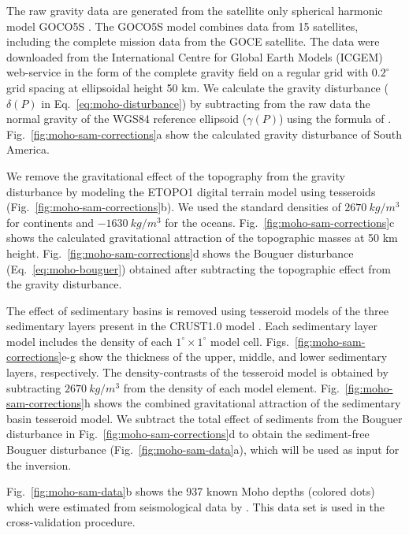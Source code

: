 The raw gravity data are generated from the satellite only
spherical harmonic model GOCO5S \citet{mayer-guerr2015}.
The GOCO5S model combines data from 15 satellites, including the complete
mission data from the GOCE satellite.
The data were downloaded from the
International Centre for Global Earth Models (ICGEM) web-service
\citep[][ \url{http://icgem.gfz-potsdam.de/ICGEM/})]{barthelmes2012}
in the form of the complete gravity field
on a regular grid with $0.2^\circ$ grid spacing at ellipsoidal height 50 km.
We calculate the gravity disturbance
($\delta(P)$ in Eq.~\ref{eq:moho-disturbance})
by subtracting from the raw data
the normal gravity of the WGS84 reference ellipsoid ($\gamma(P)$)
using the formula of \citet{li2001a}.
Fig.~\ref{fig:moho-sam-corrections}a show the calculated gravity disturbance of
South America.

We remove the gravitational effect of the topography
from the gravity disturbance
by modeling the ETOPO1 digital terrain model
\citep[][ \url{http://dx.doi.org/10.7289/V5C8276M}]{amante2009}
using tesseroids (Fig.~\ref{fig:moho-sam-corrections}b).
We used the standard densities of $2670\ kg/m^3$ for continents and
$-1630\ kg/m^3$ for the oceans.
Fig.~\ref{fig:moho-sam-corrections}c shows the calculated gravitational attraction
of the topographic masses at 50 km height.
Fig.~\ref{fig:moho-sam-corrections}d shows the Bouguer disturbance
(Eq.~\ref{eq:moho-bouguer}) obtained after subtracting the topographic effect from
the gravity disturbance.

The effect of sedimentary basins is removed using
tesseroid models of the three sedimentary layers present in the CRUST1.0 model
\citep[][ \url{http://igppweb.ucsd.edu/~gabi/rem.html}]{laske2013}.
Each sedimentary layer model includes the density
of each $1^\circ \times 1^\circ$ model cell.
Figs.~\ref{fig:moho-sam-corrections}e-g show the thickness of the upper, middle, and
lower sedimentary layers, respectively.
The density-contrasts of the tesseroid model is obtained by subtracting
$2670\ kg/m^3$ from the density of each model element.
Fig.~\ref{fig:moho-sam-corrections}h shows the combined gravitational attraction of
the sedimentary basin tesseroid model.
We subtract the total effect of sediments from the Bouguer disturbance in
Fig.~\ref{fig:moho-sam-corrections}d to obtain
the sediment-free Bouguer disturbance (Fig.~\ref{fig:moho-sam-data}a),
which will be used as input for the inversion.

Fig.~\ref{fig:moho-sam-data}b shows the 937 known Moho depths (colored dots) which
were estimated from seismological data by \citet{assumpcao2013a}.
This data set is used in the cross-validation procedure.


